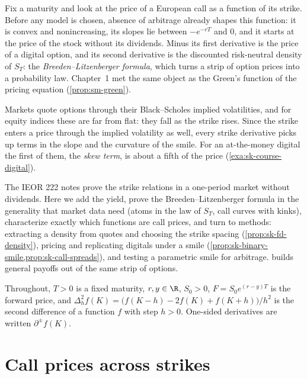 
Fix a maturity and look at the price of a European call as a function of its strike. Before
any model is chosen, absence of arbitrage already shapes this function: it is convex and
nonincreasing, its slopes lie between $-e^{-rT}$ and $0$, and it starts at the price of the
stock without its dividends. Minus its first derivative is the price of a digital option, and its
second derivative is the discounted risk-neutral density of $S_T$: the
\emph{Breeden--Litzenberger formula}, which turns a strip of option prices into a probability
law. Chapter~1 met the same object as the Green's function of the pricing equation
(\cref{prop:sm-green}).

Markets quote options through their Black--Scholes implied volatilities, and for equity indices
these are far from flat: they fall as the strike rises. Since the strike enters a price through
the implied volatility as well, every strike derivative picks up terms in the slope and the
curvature of the smile. For an at-the-money digital the first of them, the \emph{skew term}, is
about a fifth of the price (\cref{exa:sk-course-digital}).

The IEOR 222 notes prove the strike relations in a one-period market without dividends. Here we
add the yield, prove the Breeden--Litzenberger formula in the generality that market data need
(atoms in the law of $S_T$, call curves with kinks), characterize exactly which functions are call
prices, and turn to methods: extracting a density from quotes and choosing the strike spacing
(\cref{prop:sk-fd-density}), pricing and replicating digitals under a smile
(\cref{prop:sk-binary-smile,prop:sk-call-spreads}), and testing a parametric smile for
arbitrage.  builds general payoffs out of the same strip of
options.

Throughout, $T>0$ is a fixed maturity, $r,y\in\R$, $S_0>0$, $F=S_0e^{(r-y)T}$ is the forward
price, and $\Delta_h^2f(K)=\big(f(K-h)-2f(K)+f(K+h)\big)/h^2$ is the second difference of a
function $f$ with step $h>0$. One-sided derivatives are written $\partial^\pm f(K)$.

\section{Call prices across strikes}\label{sec:sk-strike}

